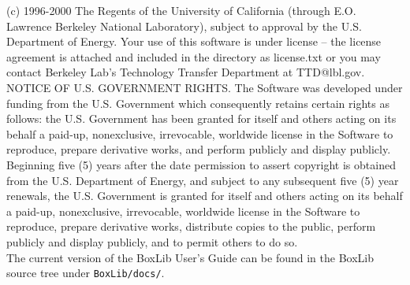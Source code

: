 \noindent (c) 1996-2000 The Regents of the University of California (through
E.O. Lawrence Berkeley National Laboratory), subject to approval by
the U.S. Department of Energy.  Your use of this software is under
license -- the license agreement is attached and included in the
directory as license.txt or you may contact Berkeley Lab's Technology
Transfer Department at TTD@lbl.gov.  NOTICE OF U.S. GOVERNMENT RIGHTS.
The Software was developed under funding from the U.S. Government
which consequently retains certain rights as follows: the
U.S. Government has been granted for itself and others acting on its
behalf a paid-up, nonexclusive, irrevocable, worldwide license in the
Software to reproduce, prepare derivative works, and perform publicly
and display publicly.  Beginning five (5) years after the date
permission to assert copyright is obtained from the U.S. Department of
Energy, and subject to any subsequent five (5) year renewals, the
U.S. Government is granted for itself and others acting on its behalf
a paid-up, nonexclusive, irrevocable, worldwide license in the
Software to reproduce, prepare derivative works, distribute copies to
the public, perform publicly and display publicly, and to permit
others to do so.\\

\noindent The current version of the BoxLib User's Guide can be found in 
the BoxLib source tree under {\tt BoxLib/docs/}.
